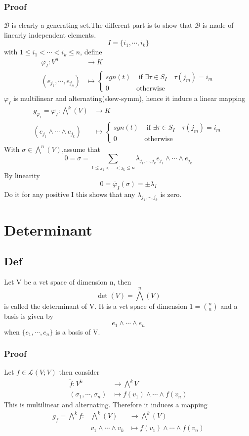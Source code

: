 \documentclass{book}
\begin{document}
\subsection{Proof}
$\mathcal{B}$ is clearly a generating set.The different part is to show that $\mathcal{B}$ is made of linearly independent elements.
$$I=\{i_1,\cdots,i_k\}$$ with $1\leq i_1<\cdots<i_k\leq n$, define
$$\begin{aligned}
    \varphi_I: V^n &\rightarrow K\\
    (e_{j_1},\cdots,e_{j_n})&\mapsto \left\{\begin{aligned}
        sgn(t) &\text{ if } \exists \tau\in S_I\quad\tau(j_m)=i_m\\
        0\quad &\text{otherwise} 
    \end{aligned}\right.
\end{aligned}$$
$\varphi_I$ is multilinear and alternating(skew-symm), hence it induce a linear mapping
$$
\begin{aligned}
    g_{\varphi_I}=\overline{\varphi_I}:\bigwedge\limits^k(V)  &\rightarrow K\\
    (e_{j_1}\wedge\cdots\wedge e_{j_k})&\mapsto \left\{\begin{aligned}
        sgn(t) &\text{ if } \exists \tau\in S_I\quad\tau(j_m)=i_m\\
        0 \quad&\text{otherwise} 
    \end{aligned}\right.
\end{aligned}
$$
With $\sigma\in\bigwedge\limits^n(V)$,assume that
$$0=\sigma=\sum\limits_{1\leq j_1<\cdots<j_k\leq n}\lambda_{j_1,\cdots,j_k}e_{j_1}\wedge\cdots\wedge e_{j_k}$$
By linearity$$0=\overline{\varphi}_I(\sigma)=\pm \lambda_I$$
Do it for any positive I this shows that any $\lambda_{j_1,\cdots,j_k}$ is zero.
\chapter{Determinant}
\section{Def}
Let V be a vct space of dimension n, then 
$$\det(V)=\bigwedge\limits^n(V)$$
is called the determinant of V. It is a vct space of dimension $1=\binom{n}{n}$ and a basis is given by $$e_1\wedge\cdots\wedge e_n$$
when $\{e_1,\cdots,e_n\}$ is a basis of V.
\subsection{Proof}
Let $f\in \mathscr{L}(V;V)$ then consider
$$\begin{aligned}
    \widetilde{f}: V^k &\rightarrow \bigwedge\limits^k V\\ 
    (\sigma_1,\cdots,\sigma_n) &\mapsto f(v_1)\wedge\cdots\wedge f(v_n)
\end{aligned}$$
This is multilinear and alternating. Therefore it induces a mapping
$$
\begin{aligned}
    g_{\widetilde{f}}=\bigwedge\limits^kf: &\bigwedge\limits^k(V) &\rightarrow\bigwedge\limits^k(V)\\
    &v_1\wedge\cdots\wedge v_k &\mapsto f(v_1)\wedge\cdots\wedge f(v_n)
\end{aligned}$$
\end{document}

